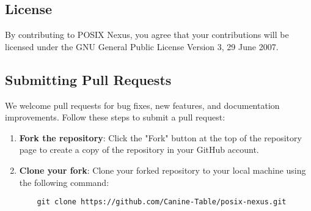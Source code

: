 \subsection{License}
By contributing to POSIX Nexus, you agree that your contributions will be licensed under the GNU General Public License Version 3, 29 June 2007.

\subsection{Submitting Pull Requests}
We welcome pull requests for bug fixes, new features, and documentation improvements. Follow these steps to submit a pull request:
\begin{enumerate}
    \item \textbf{Fork the repository}: Click the "Fork" button at the top of the repository page to create a copy of the repository in your GitHub account.
    \item \textbf{Clone your fork}: Clone your forked repository to your local machine using the following command:
    \begin{lstlisting}
    git clone https://github.com/Canine-Table/posix-nexus.git
    \end{lstlisting}
\end{enumerate}
\newpage
